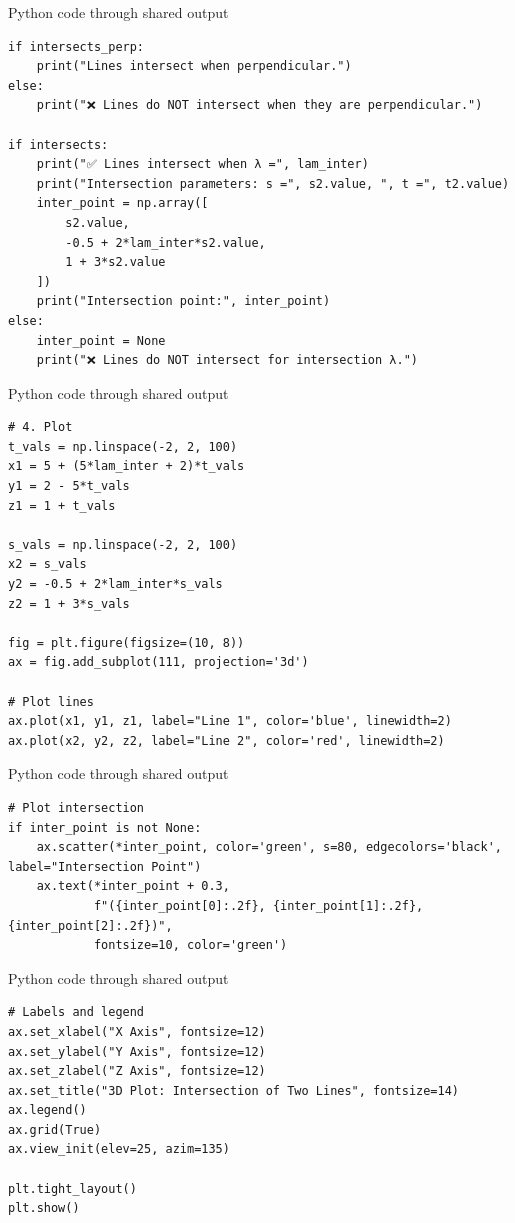 \documentclass{beamer}
\begin{document}
  \begin{frame}[fragile]{Python code through shared output}
\begin{lstlisting}
if intersects_perp:
    print("Lines intersect when perpendicular.")
else:
    print("❌ Lines do NOT intersect when they are perpendicular.")

if intersects:
    print("✅ Lines intersect when λ =", lam_inter)
    print("Intersection parameters: s =", s2.value, ", t =", t2.value)
    inter_point = np.array([
        s2.value,
        -0.5 + 2*lam_inter*s2.value,
        1 + 3*s2.value
    ])
    print("Intersection point:", inter_point)
else:
    inter_point = None
    print("❌ Lines do NOT intersect for intersection λ.")
\end{lstlisting}
\end{frame}
  \begin{frame}[fragile]{Python code through shared output}
\begin{lstlisting}
# 4. Plot
t_vals = np.linspace(-2, 2, 100)
x1 = 5 + (5*lam_inter + 2)*t_vals
y1 = 2 - 5*t_vals
z1 = 1 + t_vals

s_vals = np.linspace(-2, 2, 100)
x2 = s_vals
y2 = -0.5 + 2*lam_inter*s_vals
z2 = 1 + 3*s_vals

fig = plt.figure(figsize=(10, 8))
ax = fig.add_subplot(111, projection='3d')

# Plot lines
ax.plot(x1, y1, z1, label="Line 1", color='blue', linewidth=2)
ax.plot(x2, y2, z2, label="Line 2", color='red', linewidth=2)
\end{lstlisting}
\end{frame}
  \begin{frame}[fragile]{Python code through shared output}
\begin{lstlisting}
# Plot intersection
if inter_point is not None:
    ax.scatter(*inter_point, color='green', s=80, edgecolors='black', label="Intersection Point")
    ax.text(*inter_point + 0.3, 
            f"({inter_point[0]:.2f}, {inter_point[1]:.2f}, {inter_point[2]:.2f})",
            fontsize=10, color='green')
\end{lstlisting}
\end{frame}
  \begin{frame}[fragile]{Python code through shared output}
\begin{lstlisting}
# Labels and legend
ax.set_xlabel("X Axis", fontsize=12)
ax.set_ylabel("Y Axis", fontsize=12)
ax.set_zlabel("Z Axis", fontsize=12)
ax.set_title("3D Plot: Intersection of Two Lines", fontsize=14)
ax.legend()
ax.grid(True)
ax.view_init(elev=25, azim=135)

plt.tight_layout()
plt.show()

 \end{lstlisting}
\end{frame}
\end{document}
